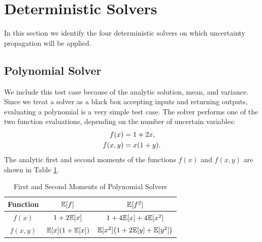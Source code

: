\section{Deterministic Solvers}
In this section we identify the four deterministic solvers on which uncertainty propagation will be applied.

\subsection{Polynomial Solver}
We include this test case because of the analytic solution, mean, and variance.  Since we treat a solver as a black box accepting inputs and returning outputs, evaluating a polynomial is a very simple test case.
The solver performs one of the two function evaluations, depending on the number of uncertain variables:
\begin{align}
f(x) &= 1+2x,\\
f(x,y) &=x\qty(1+y).
\end{align}
The analytic first and second moments of the functions $f(x)$ and $f(x,y)$ are shown in Table \ref{tab:polymoments}.
\begin{table}[H]
\centering
\begin{tabular}{c|c|c}
Function & $\mathbb{E}[ f]$ & $\mathbb{E}[ f^2]$ \\ \hline
$f(x)$ & $1+2\mathbb{E}[ x]$ & $1+4\mathbb{E}[ x]+4\mathbb{E}[ x^2]$ \\
$f(x,y)$ & $\mathbb{E}[ x]\qty(1+\mathbb{E}[ x])$ & $\mathbb{E}[ x^2]\qty(1+2\mathbb{E}[ y]+\mathbb{E}[ y^2])$
\end{tabular}
\caption{First and Second Moments of Polynomial Solvers}
\label{tab:polymoments}
\end{table}

